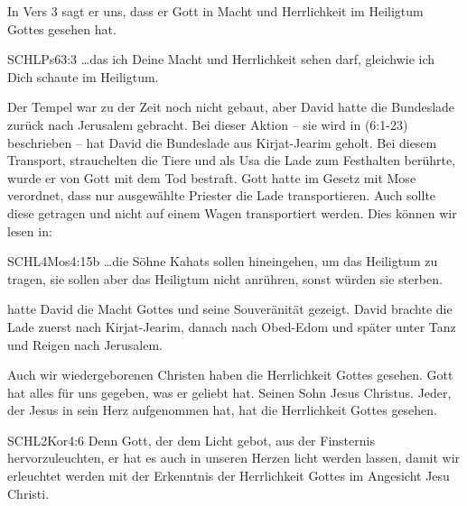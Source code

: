 \documentclass[14pt]{../../inc/mybib}
\begin{document}
    \begin{block}
        In Vers 3 sagt er uns, dass er Gott in Macht und Herrlichkeit im Heiligtum Gottes gesehen hat.
        \begin{bibelbox}{SCHL}{Ps}{63:3}
            \dots das ich Deine Macht und Herrlichkeit sehen darf, gleichwie ich Dich schaute im Heiligtum.
        \end{bibelbox}
        Der Tempel war zu der Zeit noch nicht gebaut, aber David hatte die Bundeslade zurück nach Jerusalem gebracht. Bei dieser Aktion -- sie wird in  (6:1-23) beschrieben -- hat David die Bundeslade aus Kirjat-Jearim geholt. Bei diesem Transport, strauchelten die Tiere und als Usa die Lade zum Festhalten berührte, wurde er von Gott mit dem Tod bestraft. Gott hatte im Gesetz mit Mose verordnet, dass nur ausgewählte Priester die Lade transportieren. Auch sollte diese getragen und nicht auf einem Wagen transportiert werden. Dies können wir lesen in:
        \begin{bibelbox}{SCHL}{4Mos}{4:15b}
            \dots die Söhne Kahats sollen hineingehen, um das Heiligtum zu tragen, sie sollen aber das Heiligtum nicht anrühren, sonst würden sie sterben.
        \end{bibelbox}
         hatte David die Macht Gottes und seine Souveränität gezeigt. David brachte die Lade zuerst nach Kirjat-Jearim, danach nach Obed-Edom und später unter Tanz und Reigen nach Jerusalem.
    \end{block}

    \begin{block}
        Auch wir wiedergeborenen Christen haben die Herrlichkeit Gottes gesehen. Gott hat alles für uns gegeben, was er geliebt hat. Seinen Sohn Jesus Christus. Jeder, der Jesus in sein Herz aufgenommen hat, hat die Herrlichkeit Gottes gesehen.
        \begin{bibelbox}{SCHL}{2Kor}{4:6}
            Denn Gott, der dem Licht gebot, aus der Finsternis hervorzuleuchten, er hat es auch in unseren Herzen licht werden lassen, damit wir erleuchtet werden mit der Erkenntnis der Herrlichkeit Gottes im Angesicht Jesu Christi.
        \end{bibelbox}
    \end{block}
\end{document}
